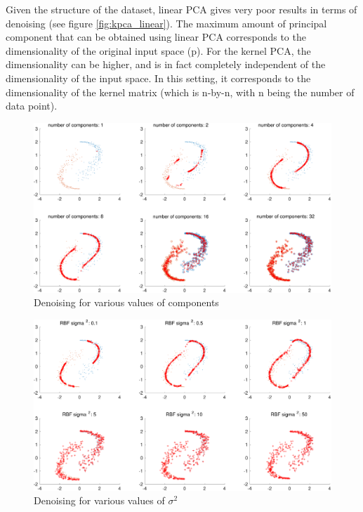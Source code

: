 \documentclass[11pt, a4paper]{article}
\begin{document}
Given the structure of the dataset, linear PCA gives very poor results
in terms of denoising (see figure \ref{fig:kpca_linear}). The maximum
amount of principal component that can be obtained using linear PCA
corresponds to the dimensionality of the original input space (p). For
the kernel PCA, the dimensionality can be higher, and is in fact
completely independent of the dimensionality of the input space. In
this setting, it corresponds to the dimensionality of the kernel
matrix (which is n-by-n, with n being the number of data point).

\begin{figure}[H]
  \centering
  \includegraphics[scale=.40]{kpca_ncomp.pdf}
  \caption{Denoising for various values of components}
  \label{fig:kpca_ncomp}
\end{figure}

\begin{figure}[H]
  \centering
  \includegraphics[scale=.40]{kpca_sigma.pdf}
  \caption{Denoising for various values of $\sigma^2$}
  \label{fig:kpca_sigma}
\end{figure}
\end{document}
